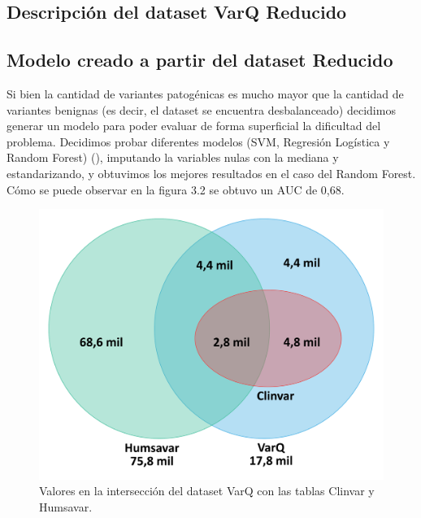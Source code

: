 \subsection{Descripción del dataset VarQ Reducido}

\subsection{Modelo creado a partir del dataset Reducido}

Si bien la cantidad de variantes patogénicas es mucho mayor que la cantidad de variantes benignas (es decir, el dataset se encuentra desbalanceado) decidimos generar un modelo para poder evaluar de forma superficial la dificultad del problema. Decidimos probar diferentes modelos (SVM, Regresión Logística y Random Forest) (), imputando la variables nulas con la mediana y estandarizando, y obtuvimos los mejores resultados en el caso del Random Forest. Cómo se puede observar en la figura 3.2 se obtuvo un AUC de 0,68. 


\begin{figure}[h]
    \centering
    \includegraphics[scale=0.4]{documents/latex/figures/3/interseccion_varq.png}
    \caption{Valores en la intersección del dataset VarQ con las tablas Clinvar y Humsavar. }
    \label{fig:interseccion_varq}
\end{figure}

